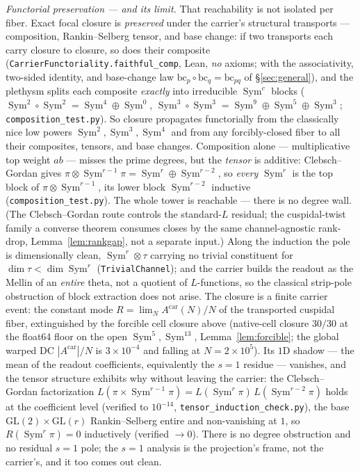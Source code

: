 \documentclass[11pt]{article}
\theoremstyle{definition}
\newcommand{\Sym}{\operatorname{Sym}}
\begin{document}
\emph{Functorial preservation --- and its limit.} That reachability is not isolated per fiber. Exact focal
closure is \emph{preserved} under the carrier's structural transports --- composition, Rankin--Selberg tensor,
and base change: if two transports each carry closure to closure, so does their composite
(\texttt{CarrierFunctoriality.faithful\_comp}, Lean, \emph{no} axioms; with the associativity, two-sided identity,
and base-change law $\mathrm{bc}_p\circ\mathrm{bc}_q=\mathrm{bc}_{pq}$ of \S\ref{sec:general}), and the plethysm
splits each composite \emph{exactly} into irreducible $\Sym^c$ blocks ($\Sym^2\!\circ\Sym^2=\Sym^4\oplus\Sym^0$,
$\Sym^3\!\circ\Sym^3=\Sym^9\oplus\Sym^5\oplus\Sym^3$; \texttt{composition\_test.py}). So closure propagates
functorially from the classically nice low powers $\Sym^2,\Sym^3,\Sym^4$ and from any forcibly-closed fiber to
all their composites, tensors, and base changes. Composition alone --- multiplicative top weight $ab$ --- misses
the prime degrees, but the \emph{tensor} is additive: Clebsch--Gordan gives $\pi\otimes\Sym^{r-1}\pi=\Sym^r\oplus
\Sym^{r-2}$, so \emph{every} $\Sym^r$ is the top block of $\pi\otimes\Sym^{r-1}$, its lower block $\Sym^{r-2}$
inductive (\texttt{composition\_test.py}). The whole tower is reachable --- there is no degree wall. (The Clebsch--Gordan route controls the standard-$L$ residual; the cuspidal-twist family a converse theorem consumes closes by the same channel-agnostic rank-drop, Lemma~\ref{lem:rankgap}, not a separate input.) Along the
induction the pole is dimensionally clean, $\Sym^r\otimes\tau$ carrying no trivial constituent for
$\dim\tau<\dim\Sym^r$ (\texttt{TrivialChannel}); and the carrier builds the readout as the Mellin of an
\emph{entire} theta, not a quotient of $L$-functions, so the classical strip-pole obstruction of block extraction
does not arise. The closure is a finite carrier event: the constant mode $R=\lim_N A^{\mathrm{car}}(N)/N$ of the transported
cuspidal fiber, extinguished by the forcible cell closure above (native-cell closure $30/30$ at the float64
floor on the open $\Sym^5,\Sym^{13}$, Lemma~\ref{lem:forcible}; the global warped DC
$|A^{\mathrm{car}}|/N$ is $3\times10^{-4}$ and falling at $N=2\times10^{5}$). Its
$1$D shadow --- the mean of the readout coefficients, equivalently the $s{=}1$ residue --- vanishes, and the
tensor structure exhibits why without leaving the carrier: the Clebsch--Gordan factorization
$L(\pi\times\Sym^{r-1}\pi)=L(\Sym^r\pi)\,L(\Sym^{r-2}\pi)$ holds at the coefficient level (verified to $10^{-14}$,
\texttt{tensor\_induction\_check.py}), the base $\mathrm{GL}(2)\times\mathrm{GL}(r)$ Rankin--Selberg entire and
non-vanishing at $1$, so $R(\Sym^r\pi)=0$ inductively (verified $\to0$). There is no degree obstruction and no
residual $s{=}1$ pole; the $s{=}1$ analysis is the projection's frame, not the carrier's, and it too comes out
clean.
\end{document}
